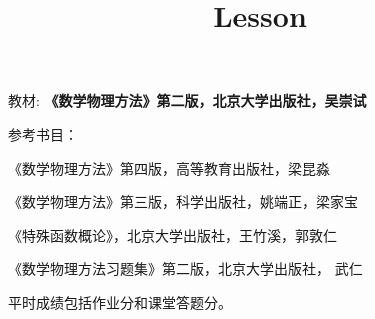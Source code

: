 \documentclass[CJK]{beamer}
\title{Lesson }
\author{}
\date{}
\begin{document}


\begin{frame}
\bch
{}
\ech
\end{frame}


\begin{frame}
\bch
教材:
{\bf \blue《数学物理方法》第二版，北京大学出版社，吴崇试}

\skiplines

参考书目：
\bitem
\item{《数学物理方法》第四版，高等教育出版社，梁昆淼}  
\item{《数学物理方法》第三版，科学出版社，姚端正，梁家宝}
\item{《特殊函数概论》，北京大学出版社，王竹溪，郭敦仁}
\item{《数学物理方法习题集》第二版，北京大学出版社， 武仁}
  \eitem
\ech
\end{frame}


\begin{frame}
\bch
{}

平时成绩包括作业分和课堂答题分。

\ech
\end{frame}
\end{document}

